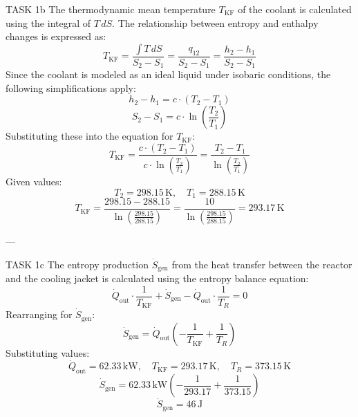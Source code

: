TASK 1b  
The thermodynamic mean temperature \( T_{\text{KF}} \) of the coolant is calculated using the integral of \( T \, dS \). The relationship between entropy and enthalpy changes is expressed as:  
\[
T_{\text{KF}} = \frac{\int T \, dS}{S_2 - S_1} = \frac{q_{12}}{S_2 - S_1} = \frac{h_2 - h_1}{S_2 - S_1}
\]  
Since the coolant is modeled as an ideal liquid under isobaric conditions, the following simplifications apply:  
\[
h_2 - h_1 = c \cdot (T_2 - T_1)
\]  
\[
S_2 - S_1 = c \cdot \ln\left(\frac{T_2}{T_1}\right)
\]  
Substituting these into the equation for \( T_{\text{KF}} \):  
\[
T_{\text{KF}} = \frac{c \cdot (T_2 - T_1)}{c \cdot \ln\left(\frac{T_2}{T_1}\right)} = \frac{T_2 - T_1}{\ln\left(\frac{T_2}{T_1}\right)}
\]  
Given values:  
\[
T_2 = 298.15 \, \text{K}, \quad T_1 = 288.15 \, \text{K}
\]  
\[
T_{\text{KF}} = \frac{298.15 - 288.15}{\ln\left(\frac{298.15}{288.15}\right)} = \frac{10}{\ln\left(\frac{298.15}{288.15}\right)} = 293.17 \, \text{K}
\]  

---

TASK 1c  
The entropy production \( \dot{S}_{\text{gen}} \) from the heat transfer between the reactor and the cooling jacket is calculated using the entropy balance equation:  
\[
\dot{Q}_{\text{out}} \cdot \frac{1}{T_{\text{KF}}} + \dot{S}_{\text{gen}} - \dot{Q}_{\text{out}} \cdot \frac{1}{T_R} = 0
\]  
Rearranging for \( \dot{S}_{\text{gen}} \):  
\[
\dot{S}_{\text{gen}} = \dot{Q}_{\text{out}} \left(-\frac{1}{T_{\text{KF}}} + \frac{1}{T_R}\right)
\]  
Substituting values:  
\[
\dot{Q}_{\text{out}} = 62.33 \, \text{kW}, \quad T_{\text{KF}} = 293.17 \, \text{K}, \quad T_R = 373.15 \, \text{K}
\]  
\[
\dot{S}_{\text{gen}} = 62.33 \, \text{kW} \left(-\frac{1}{293.17} + \frac{1}{373.15}\right)
\]  
\[
\dot{S}_{\text{gen}} = 46 \, \text{J}
\]  